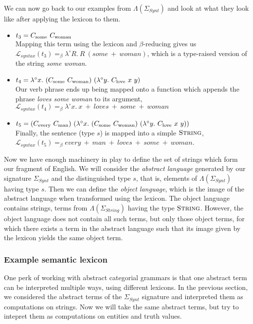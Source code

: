 We can now go back to our examples from $\Lambda(\Sigma_{Synt})$ and
look at what they look like after applying the lexicon to them.
\begin{itemize}
\item $t_3 = \synt{some}\ \synt{woman}$ \\ Mapping this term using the
  lexicon and $\beta$-reducing gives us $\mathcal{L}_{syntax}(t_3)
  =_{\beta} \lambda^{\circ} R.\ R\ (some\ +\ woman)$, which is a
  type-raised version of the string \emph{some woman}.
\item $t_4 = \lambda^{\circ}
  x.\ (C_{\textrm{some}}\ C_{\textrm{woman}})\ (\lambda^{\circ}
  y.\ C_{\textrm{love}}\ x\ y)$ \\ Our verb phrase ends up being mapped onto
  a function which appends the phrase \emph{loves some woman} to its
  argument, $\mathcal{L}_{syntax}(t_4) =_{\beta} \lambda^{\circ}
  x.\ x\ +\ loves\ +\ some\ +\ woman$
\item $t_5 = (\synt{every}\ \synt{man})\ (\lambda^{\circ}
  x.\ (\synt{some}\ \synt{woman})\ (\lambda^{\circ}
  y.\ \synt{love}\ x\ y))$ \\ Finally, the sentence (type $s$) is mapped
  into a simple $\textsc{String}$, $\mathcal{L}_{syntax}(t_5) =_{\beta}
  every\ +\ man\ +\ loves\ +\ some\ +\ woman$.
\end{itemize}

Now we have enough machinery in play to define the set of strings which
form our fragment of English. We will consider the \emph{abstract
  language} generated by our signature $\Sigma_{Synt}$ and the
distinguished type $s$, that is, elements of $\Lambda(\Sigma_{Synt})$
having type $s$. Then we can define the \emph{object language}, which is
the image of the abstract language when transformed using the
lexicon. The object language contains strings, terms from
$\Lambda(\Sigma_{String})$ having the type $\textsc{String}$. However,
the object language does not contain all such terms, but only those
object terms, for which there exists a term in the abstract language
such that its image given by the lexicon yields the same object term.

\subsubsection{Example semantic lexicon}

One perk of working with abstract categorial grammars is that one
abstract term can be interpreted multiple ways, using different
lexicons. In the previous section, we considered the abstract terms of
the $\Sigma_{Synt}$ signature and interpreted them as computations on
strings. Now we will take the same abstract terms, but try to intepret
them as computations on entities and truth values.

